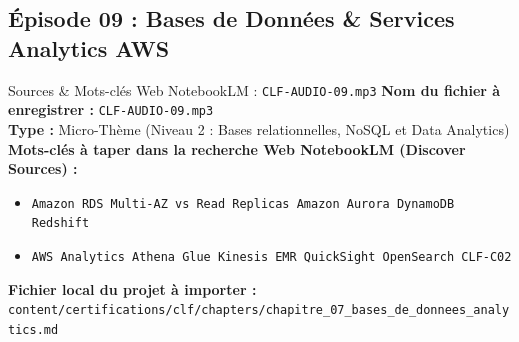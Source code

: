 \documentclass[11pt,a4paper]{article}
\begin{document}
\subsection{Épisode 09 : Bases de Données \& Services Analytics AWS}
\begin{sourcebox}{Sources \& Mots-clés Web NotebookLM : \texttt{CLF-AUDIO-09.mp3}}
\textbf{Nom du fichier à enregistrer :} \texttt{CLF-AUDIO-09.mp3}\\
\textbf{Type :} Micro-Thème (Niveau 2 : Bases relationnelles, NoSQL et Data Analytics)\\
\textbf{Mots-clés à taper dans la recherche Web NotebookLM (Discover Sources) :}
\begin{itemize}[noitemsep]
    \item \texttt{Amazon RDS Multi-AZ vs Read Replicas Amazon Aurora DynamoDB Redshift}
    \item \texttt{AWS Analytics Athena Glue Kinesis EMR QuickSight OpenSearch CLF-C02}
\end{itemize}
\textbf{Fichier local du projet à importer :}
\texttt{content/certifications/clf/chapters/chapitre_07_bases_de_donnees_analytics.md}
\end{sourcebox}
\end{document}
